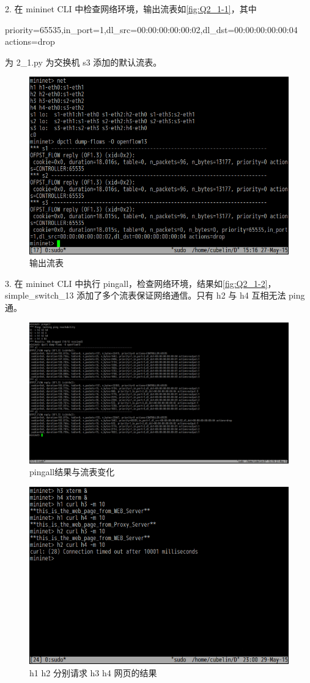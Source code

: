 \documentclass[format=draft,language=chinese,category=SDN]{hustreport}
\begin{document}
2. 在 mininet CLI 中检查网络环境，输出流表如\autoref{fig:Q2_1-1}，其中
\begin{center}
priority=65535,in\_port=1,dl\_src=00:00:00:00:00:02,dl\_dst=00:00:00:00:00:04 actions=drop
\end{center}

为 2\_1.py 为交换机 s3 添加的默认流表。

\begin{figure}[!h]
\centering
\includegraphics[width=.618\textwidth]{fig/2_1-1.png}
\caption{输出流表}\label{fig:Q2_1-1}
\end{figure}

3. 在 mininet CLI 中执行 pingall，检查网络环境，结果如\autoref{fig:Q2_1-2}，simple\_switch\_13 添加了多个流表保证网络通信。只有 h2 与 h4 互相无法 ping 通。

\begin{figure}[!h]
\centering
\includegraphics[width=\textwidth]{fig/2_1-2.png}
\caption{pingall结果与流表变化}\label{fig:Q2_1-2}
\end{figure}

\begin{figure}[!h]
\centering
\includegraphics[width=.618\textwidth]{fig/2_1-3.png}
\caption{h1 h2 分别请求 h3 h4 网页的结果}\label{fig:Q2_1-3}
\end{figure}
\end{document}
